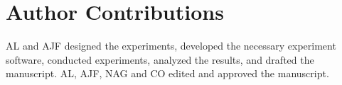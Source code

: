 

\section*{Author Contributions}

AL and AJF designed the experiments, developed the necessary experiment software, conducted experiments, analyzed the results, and drafted the manuscript. 
AL, AJF, NAG and CO edited and approved the manuscript. 
